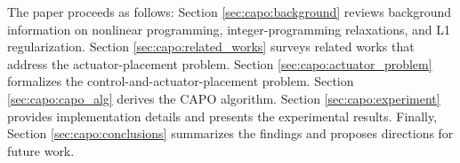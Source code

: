 The paper proceeds as follows: Section \ref{sec:capo:background} reviews background information on nonlinear programming, integer-programming relaxations, and L1 regularization. Section \ref{sec:capo:related_works} surveys related works that address the actuator-placement problem. Section \ref{sec:capo:actuator_problem} formalizes the control-and-actuator-placement problem. Section \ref{sec:capo:capo_alg} derives the CAPO algorithm. Section \ref{sec:capo:experiment} provides implementation details and presents the experimental results. Finally, Section \ref{sec:capo:conclusions} summarizes the findings and proposes directions for future work.

